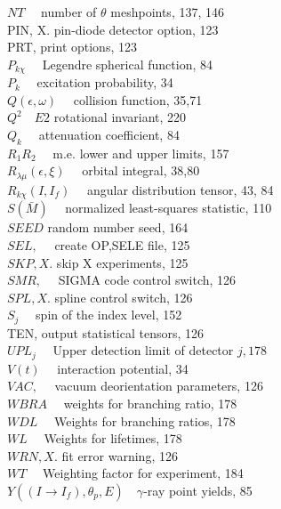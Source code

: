\documentclass[10pt]{article}
\begin{document}
$N T \quad$ number of $\theta$ meshpoints, 137, 146\\
PIN, X. pin-diode detector option, 123\\
PRT, print options, 123\\
$P_{k \chi} \quad$ Legendre spherical function, 84\\
$P_{k} \quad$ excitation probability, 34\\
$Q(\epsilon, \omega) \quad$ collision function, 35,71\\
$Q^{2} \quad E 2$ rotational invariant, 220\\
$Q_{k} \quad$ attenuation coefficient, 84\\
$R_{1} R_{2} \quad$ m.e. lower and upper limits, 157\\
$R_{\lambda \mu}(\epsilon, \xi) \quad$ orbital integral, 38,80\\
$R_{k \chi}\left(I, I_{f}\right) \quad$ angular distribution tensor, 43, 84\\
$S(\bar{M}) \quad$ normalized least-squares statistic, 110\\
$S E E D$ random number seed, 164\\
$S E L, \quad$ create OP,SELE file, 125\\
$S K P, X$. skip X experiments, 125\\
$S M R, \quad$ SIGMA code control switch, 126\\
$S P L, X$. spline control switch, 126\\
$S_{j} \quad$ spin of the index level, 152\\
TEN, output statistical tensors, 126\\
$U P L_{j} \quad$ Upper detection limit of detector $j, 178$\\
$V(t) \quad$ interaction potential, 34\\
$V A C, \quad$ vacuum deorientation parameters, 126\\
$W B R A \quad$ weights for branching ratio, 178\\
$W D L \quad$ Weights for branching ratios, 178\\
$W L \quad$ Weights for lifetimes, 178\\
$W R N, X$. fit error warning, 126\\
$W T \quad$ Weighting factor for experiment, 184\\
$Y\left(\left(I \rightarrow I_{f}\right), \theta_{p}, E\right) \quad \gamma$-ray point yields, 85
\end{document}
